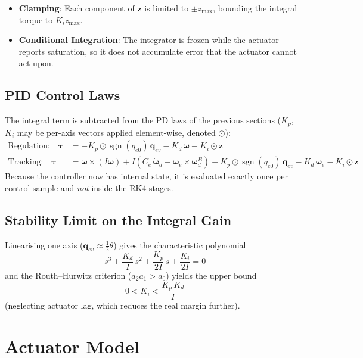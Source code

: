 \documentclass[11pt, a4paper]{article}
\newcommand{\vect}[1]{\boldsymbol{#1}}
\newcommand{\w}{\vect{\omega}}
\newcommand{\sgn}{\operatorname{sgn}}
\begin{document}
\begin{itemize}
    \item \textbf{Clamping}: Each component of $\vect{z}$ is limited to $\pm z_{\max}$, bounding the integral torque to $K_i z_{\max}$.
    \item \textbf{Conditional Integration}: The integrator is frozen while the actuator reports saturation, so it does not accumulate error that the actuator cannot act upon.
\end{itemize}

\subsection{PID Control Laws}
The integral term is subtracted from the PD laws of the previous sections ($K_p$, $K_i$ may be per-axis vectors applied element-wise, denoted $\odot$):
\begin{align}
\text{Regulation:} \quad \vect{\tau} &= -K_p \odot \sgn(q_{e0})\, \vect{q}_{ev} - K_d\, \w - K_i \odot \vect{z} \\
\text{Tracking:} \quad \vect{\tau} &= \w \times (I\w) + I \left( C_e\, \dot{\w}_d - \w_e \times \w_d^B \right) - K_p \odot \sgn(q_{e0})\, \vect{q}_{ev} - K_d\, \w_e - K_i \odot \vect{z}
\end{align}
Because the controller now has internal state, it is evaluated exactly once per control sample and \emph{not} inside the RK4 stages.

\subsection{Stability Limit on the Integral Gain}
Linearising one axis ($\vect{q}_{ev} \approx \tfrac{1}{2}\theta$) gives the characteristic polynomial
\begin{equation}
s^3 + \frac{K_d}{I}\, s^2 + \frac{K_p}{2I}\, s + \frac{K_i}{2I} = 0
\end{equation}
and the Routh--Hurwitz criterion ($a_2 a_1 > a_0$) yields the upper bound
\begin{equation}
0 < K_i < \frac{K_p\, K_d}{I}
\end{equation}
(neglecting actuator lag, which reduces the real margin further).

\section{Actuator Model}
\end{document}

